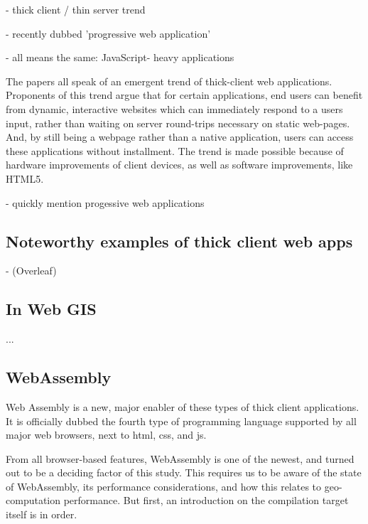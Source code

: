 - thick client / thin server trend 

- recently dubbed 'progressive web application'

- all means the same: JavaScript- heavy applications


\cite{hamilton_client-side_2014, panidi_hybrid_2015, kulawiak_analysis_2019}
The papers  all speak of an emergent trend of thick-client web applications. 
Proponents of this trend argue that for certain applications, end users can benefit from dynamic, interactive websites which can immediately respond to a users input, rather than waiting on server round-trips necessary on static web-pages. 
And, by still being a webpage rather than a native application, users can access these applications without installment. 
The trend is made possible because of hardware improvements of client devices, as well as software improvements, like HTML5.

- quickly mention progessive web applications

\subsection*{Noteworthy examples of thick client web apps}

- (Overleaf)

\subsection{In Web GIS}
\label{sec:background-webgis}

...

\subsection{WebAssembly}
\label{sec:background-wasm}

Web Assembly is a new, major enabler of these types of thick client applications.
It is officially dubbed the fourth type of programming language supported by all major web browsers, next to html, css, and js.

From all browser-based features, WebAssembly is one of the newest, and turned out to be a deciding factor of this study. This requires us to be aware of the state of WebAssembly, its performance considerations, and how this relates to geo-computation performance. But first, an introduction on the compilation target itself is in order.

